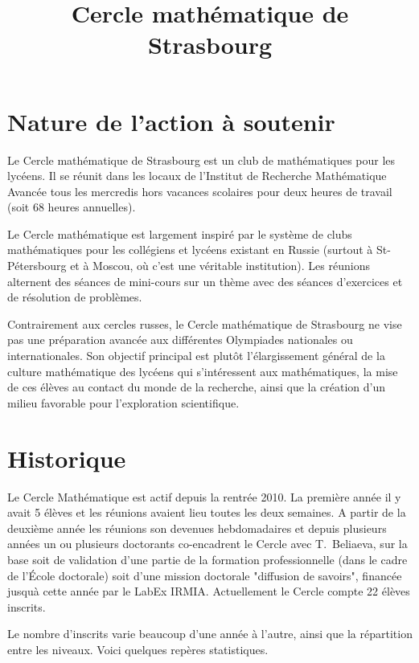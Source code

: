 \documentclass[11pt,notitlepage]{article}
\title{Cercle math\'ematique de Strasbourg}
\date{}
\begin{document}
\maketitle

\section{Nature de l'action \`a soutenir}
 
 Le Cercle math\'ematique de Strasbourg est un club de math\'ematiques pour les lyc\'eens. 
 Il se r\'eunit dans les locaux de l'Institut de Recherche Math\'ematique Avanc\'ee tous  les mercredis hors vacances scolaires pour deux heures de travail (soit 68 heures annuelles).
 
 Le Cercle math\'ematique est largement inspir\'e par le syst\`eme de
 clubs math\'ematiques pour les coll\'egiens et lyc\'eens existant en
 Russie (surtout \`a St-P\'etersbourg et \`a Moscou, o\`u c'est une  v\'eritable institution). Les r\'eunions alternent des s\'eances de mini-cours sur un th\`eme
 avec des s\'eances d'exercices et de r\'esolution de probl\`emes. 
 
 Contrairement aux cercles russes, le Cercle math\'ematique de
 Strasbourg ne vise pas une pr\'eparation avanc\'ee aux diff\'erentes
 Olympiades nationales ou internationales. Son objectif principal est
 plut\^ot l'\'elargissement g\'en\'eral de la culture math\'ematique des
 lyc\'eens qui s'int\'eressent aux math\'e\-matiques, la mise de ces
 \'el\`eves au contact du monde de la recherche, ainsi que la cr\'eation d'un milieu favorable pour l'exploration scientifique.
 

\section{Historique}
Le Cercle Math\'ematique est actif depuis la rentr\'ee 2010. La premi\`ere ann\'ee il y avait 5 \'el\`eves et les r\'eunions avaient lieu toutes les deux semaines. 
A partir de la deuxi\`eme ann\'ee les r\'eunions son devenues hebdomadaires et depuis plusieurs ann\'ees un ou plusieurs doctorants co-encadrent le Cercle avec T.~Beliaeva, 
sur la base soit de validation d'une partie de la formation professionnelle (dans le cadre de l'\'Ecole doctorale) soit d'une mission doctorale "diffusion de savoirs", 
financ\'ee jusqu\`a cette ann\'ee par le LabEx IRMIA. Actuellement le Cercle  compte 22 \'el\`eves inscrits.

Le nombre d'inscrits varie beaucoup d'une ann\'ee \`a l'autre, ainsi que la r\'epartition entre les niveaux. Voici quelques rep\`eres statistiques.
\end{document}
